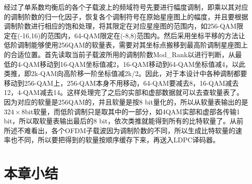 经过了单系数均衡后的各个子载波上的频域符号先要进行幅度调制，即乘以其对应的调制阶数的归一化因子，恢复各个调制符号在原始星座图上的幅度，并且要根据调制阶数进行相应的饱和处理，将其限定在对应星座图的范围内，如256-QAM限定在(-16,16)的范围内，64-QAM限定在(-8,8)范围内。然后采用坐标平移的方法让低阶调制能够使用256QAM的软量表，需要对其坐标点搬移到最高阶调制星座图上的合适位置。首先读取当前子载波所用的调制阶数Mod_Rank以进行判断，从最低的4-QAM移动到16-QAM坐标值减2，16-QAM移动到64-QAM坐标值减4，以此类推，即2k-QAM向高阶移一阶坐标值减2k/2。因此，对于本设计中各种调制都要移动到256-QAM上，256-QAM本身不用移动，64-QAM要减去8，16-QAM减去12，4-QAM减去14。这样处理完了之后的实部和虚部数据就可以去查软量表了。因为对应的软量是256QAM的，并且软量是按8 bit量化的，所以从软量表输出的是 32$4\times 8$bit软量，而低阶调制只是取其中的一部分，如4QAM实部和虚部各传输1 bit，所以取软量表输出最后的8 bit，依次类推就能得到所有的比特软量了。从前所述不难看出，各个OFDM子载波因为调制阶数的不同，所以生成比特软量的速率也不同，所以要把得到的软量按顺序缓存下来，再送入LDPC译码器。
\section{本章小结}
